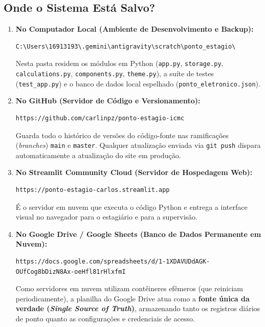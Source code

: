 \documentclass[11pt,a4paper]{article}
\begin{document}
\subsection{Onde o Sistema Está Salvo?}
\begin{enumerate}[leftmargin=1.5em]
    \item \textbf{No Computador Local (Ambiente de Desenvolvimento e Backup):}
    \begin{lstlisting}
C:\Users\16913193\.gemini\antigravity\scratch\ponto_estagio\
    \end{lstlisting}
    Nesta pasta residem os módulos em Python (\texttt{app.py}, \texttt{storage.py}, \texttt{calculations.py}, \texttt{components.py}, \texttt{theme.py}), a suíte de testes (\texttt{test\_app.py}) e o banco de dados local espelhado (\texttt{ponto\_eletronico.json}).

    \item \textbf{No GitHub (Servidor de Código e Versionamento):}
    \begin{lstlisting}
https://github.com/carlinpz/ponto-estagio-icmc
    \end{lstlisting}
    Guarda todo o histórico de versões do código-fonte nas ramificações (\textit{branches}) \texttt{main} e \texttt{master}. Qualquer atualização enviada via \texttt{git push} dispara automaticamente a atualização do site em produção.

    \item \textbf{No Streamlit Community Cloud (Servidor de Hospedagem Web):}
    \begin{lstlisting}
https://ponto-estagio-carlos.streamlit.app
    \end{lstlisting}
    É o servidor em nuvem que executa o código Python e entrega a interface visual no navegador para o estagiário e para a supervisão.

    \item \textbf{No Google Drive / Google Sheets (Banco de Dados Permanente em Nuvem):}
    \begin{lstlisting}
https://docs.google.com/spreadsheets/d/1-1XDAVUDdAGK-OUfCog8bDizN8Ax-oeHfl81rHlxfmI
    \end{lstlisting}
    Como servidores em nuvem utilizam contêineres efêmeros (que reiniciam periodicamente), a planilha do Google Drive atua como a \textbf{fonte única da verdade (\textit{Single Source of Truth})}, armazenando tanto os registros diários de ponto quanto as configurações e credenciais de acesso.
\end{enumerate}
\end{document}
